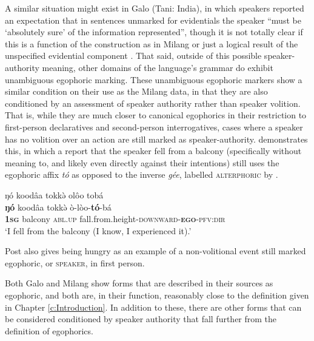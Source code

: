 A similar situation might exist in Galo (Tani: India), in which speakers reported an expectation that in sentences unmarked for evidentials the speaker ``must be `absolutely sure' of the information represented'', though it is not totally clear if this is a function of the construction as in Milang or just a logical result of the unspecified evidential component \cite[112]{Post2013}. That said, outside of this possible speaker-authority meaning, other domains of the language's grammar do exhibit unambiguous egophoric marking. These unambiguous egophoric markers show a similar condition on their use as the Milang data, in that they are also conditioned by an assessment of speaker authority rather than speaker volition. That is, while they are much closer to canonical egophorics in their restriction to first-person declaratives and second-person interrogatives, cases where a speaker has no volition over an action are still marked as speaker-authority.  demonstrates this, in which a report that the speaker fell from a balcony (specifically without meaning to, and likely even directly against their intentions) still uses the egophoric affix \textit{tó} as opposed to the inverse \textit{gée}, labelled \textsc{alterphoric} by .

\begin{exe}
        \ex \label{e:Description:GaloNonVolition}
        \glll ŋó koodâa tokkə̀ {olôo tobá} \\
        \textbf{ŋó} koodâa tokkə̀ ò-lòo-\textbf{tó}-bá \\
        \textbf{\textsc{1sg}} balcony \textsc{abl.up} fall.from.height-\textsc{downward}-\textsc{\textbf{ego}}-\textsc{pfv:dir} \\
        \glt `I fell from the balcony (I know, I experienced it).' \cite[Galo,][123, emphasis from source]{Post2013}
\end{exe}

Post also gives being hungry as an example of a non-volitional event still marked egophoric, or \textsc{speaker}, in first person.

Both Galo and Milang show forms that are described in their sources as egophoric, and both are, in their function, reasonably close to the definition given in Chapter \ref{c:Introduction}. In addition to these, there are other forms that can be considered conditioned by speaker authority that fall further from the definition of egophorics.


